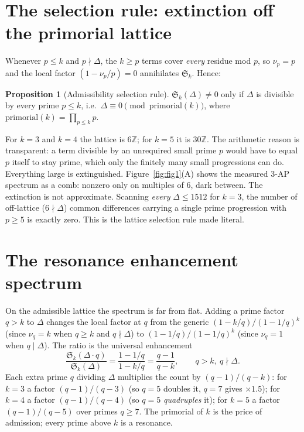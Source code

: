 \documentclass[11pt]{article}
\theoremstyle{definition}
\newtheorem{proposition}{Proposition}
\newcommand{\Sing}{\mathfrak{S}}
\begin{document}
\section{The selection rule: extinction off the primorial lattice}
Whenever $p\le k$ and $p\nmid\Delta$, the $k\ge p$ terms cover \emph{every} residue mod $p$, so
$\nu_p=p$ and the local factor $(1-\nu_p/p)=0$ annihilates $\Sing_k$. Hence:

\begin{proposition}[Admissibility selection rule]
$\Sing_k(\Delta)\ne0$ only if $\Delta$ is divisible by every prime $p\le k$, i.e.\
$\Delta\equiv0 \pmod{\mathrm{primorial}(k)}$, where $\mathrm{primorial}(k)=\prod_{p\le k}p$.
\end{proposition}

For $k=3$ and $k=4$ the lattice is $6\mathbb{Z}$; for $k=5$ it is $30\mathbb{Z}$. The arithmetic
reason is transparent: a term divisible by an unrequired small prime $p$ would have to equal $p$
itself to stay prime, which only the finitely many small progressions can do. Everything large is
extinguished. Figure~\ref{fig:fig1}(A) shows the measured $3$-AP spectrum as a comb: nonzero only on
multiples of $6$, dark between. The extinction is not approximate. Scanning \emph{every}
$\Delta\le1512$ for $k=3$, the number of off-lattice ($6\nmid\Delta$) common differences carrying a
single prime progression with $p\ge5$ is exactly zero. This is the lattice selection rule made
literal.

\section{The resonance enhancement spectrum}
On the admissible lattice the spectrum is far from flat. Adding a prime factor $q>k$ to $\Delta$
changes the local factor at $q$ from the generic $(1-k/q)/(1-1/q)^k$ (since $\nu_q=k$ when $q\ge k$
and $q\nmid\Delta$) to $(1-1/q)/(1-1/q)^k$ (since $\nu_q=1$ when $q\mid\Delta$). The ratio is the
universal enhancement
\begin{equation}
\frac{\Sing_k(\Delta\cdot q)}{\Sing_k(\Delta)}=\frac{1-1/q}{1-k/q}=\frac{q-1}{q-k},
\qquad q>k,\ q\nmid\Delta .
\label{eq:gain}
\end{equation}
Each extra prime $q$ dividing $\Delta$ multiplies the count by $(q-1)/(q-k)$: for $k=3$ a factor
$(q-1)/(q-3)$ (so $q=5$ doubles it, $q=7$ gives $\times1.5$); for $k=4$ a factor $(q-1)/(q-4)$ (so
$q=5$ \emph{quadruples} it); for $k=5$ a factor $(q-1)/(q-5)$ over primes $q\ge7$. The primorial of
$k$ is the price of admission; every prime above $k$ is a resonance.
\end{document}
